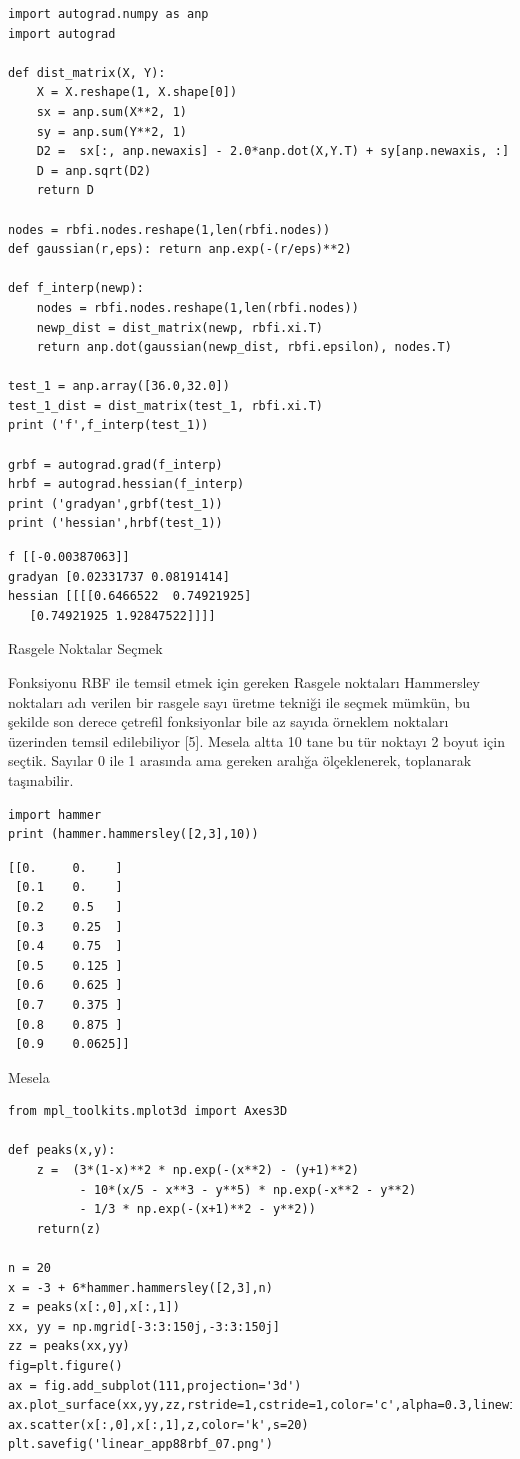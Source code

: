 \documentclass[12pt,fleqn]{article}\usepackage{../../common}
\begin{document}
\begin{verbatim}
import autograd.numpy as anp
import autograd

def dist_matrix(X, Y):
    X = X.reshape(1, X.shape[0])
    sx = anp.sum(X**2, 1)
    sy = anp.sum(Y**2, 1)
    D2 =  sx[:, anp.newaxis] - 2.0*anp.dot(X,Y.T) + sy[anp.newaxis, :] 
    D = anp.sqrt(D2)
    return D
    
nodes = rbfi.nodes.reshape(1,len(rbfi.nodes))
def gaussian(r,eps): return anp.exp(-(r/eps)**2)

def f_interp(newp):
    nodes = rbfi.nodes.reshape(1,len(rbfi.nodes))    
    newp_dist = dist_matrix(newp, rbfi.xi.T)
    return anp.dot(gaussian(newp_dist, rbfi.epsilon), nodes.T)

test_1 = anp.array([36.0,32.0])
test_1_dist = dist_matrix(test_1, rbfi.xi.T)
print ('f',f_interp(test_1))

grbf = autograd.grad(f_interp)
hrbf = autograd.hessian(f_interp)
print ('gradyan',grbf(test_1))
print ('hessian',hrbf(test_1))
\end{verbatim}

\begin{verbatim}
f [[-0.00387063]]
gradyan [0.02331737 0.08191414]
hessian [[[[0.6466522  0.74921925]
   [0.74921925 1.92847522]]]]
\end{verbatim}

Rasgele Noktalar Seçmek

Fonksiyonu RBF ile temsil etmek için gereken Rasgele noktaları Hammersley
noktaları adı verilen bir rasgele sayı üretme tekniği ile seçmek mümkün, bu
şekilde son derece çetrefil fonksiyonlar bile az sayıda örneklem noktaları
üzerinden temsil edilebiliyor [5]. Mesela altta 10 tane bu tür noktayı 2
boyut için seçtik. Sayılar 0 ile 1 arasında ama gereken aralığa
ölçeklenerek, toplanarak taşınabilir.

\begin{verbatim}
import hammer
print (hammer.hammersley([2,3],10))
\end{verbatim}

\begin{verbatim}
[[0.     0.    ]
 [0.1    0.    ]
 [0.2    0.5   ]
 [0.3    0.25  ]
 [0.4    0.75  ]
 [0.5    0.125 ]
 [0.6    0.625 ]
 [0.7    0.375 ]
 [0.8    0.875 ]
 [0.9    0.0625]]
\end{verbatim}

Mesela

\begin{verbatim}
from mpl_toolkits.mplot3d import Axes3D

def peaks(x,y):
    z =  (3*(1-x)**2 * np.exp(-(x**2) - (y+1)**2) 
          - 10*(x/5 - x**3 - y**5) * np.exp(-x**2 - y**2)
          - 1/3 * np.exp(-(x+1)**2 - y**2)) 
    return(z)
 
n = 20
x = -3 + 6*hammer.hammersley([2,3],n)
z = peaks(x[:,0],x[:,1])
xx, yy = np.mgrid[-3:3:150j,-3:3:150j]
zz = peaks(xx,yy)
fig=plt.figure()
ax = fig.add_subplot(111,projection='3d')
ax.plot_surface(xx,yy,zz,rstride=1,cstride=1,color='c',alpha=0.3,linewidth=0)
ax.scatter(x[:,0],x[:,1],z,color='k',s=20)
plt.savefig('linear_app88rbf_07.png')
\end{verbatim}
\end{document}
